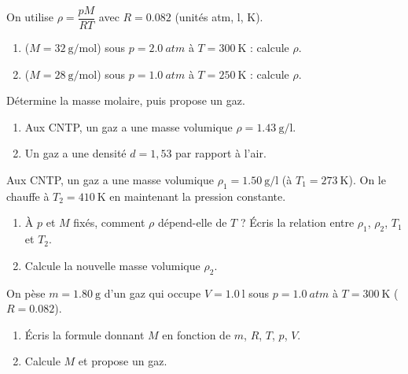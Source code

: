 \documentclass[11pt,a4paper]{article}
\begin{document}
\begin{exo}
On utilise $\rho=\dfrac{pM}{RT}$ avec $R=\num{0,082}$ (unités \si{atm}, \si{\litre}, \si{\kelvin}).
\begin{enumerate}[label=\alph*)]
  \item {} ($M=\qty{32}{\gram\per\mole}$) sous $p=\qty{2.0}{atm}$ à $T=\qty{300}{\kelvin}$ :
        calcule $\rho$.
  \item {} ($M=\qty{28}{\gram\per\mole}$) sous $p=\qty{1.0}{atm}$ à $T=\qty{250}{\kelvin}$ :
        calcule $\rho$.
\end{enumerate}
\end{exo}

\begin{exo}
Détermine la masse molaire, puis propose un gaz.
\begin{enumerate}[label=\alph*)]
  \item Aux CNTP, un gaz a une masse volumique $\rho=\qty{1.43}{\gram\per\litre}$.
  \item Un gaz a une densité $d=1{,}53$ par rapport à l'air.
\end{enumerate}
\end{exo}

\begin{exo}
Aux CNTP, un gaz a une masse volumique $\rho_1=\qty{1.50}{\gram\per\litre}$ (à $T_1=\qty{273}{\kelvin}$).
On le chauffe à $T_2=\qty{410}{\kelvin}$ en maintenant la pression constante.
\begin{enumerate}[label=\alph*)]
  \item À $p$ et $M$ fixés, comment $\rho$ dépend-elle de $T$ ? Écris la relation entre $\rho_1$,
        $\rho_2$, $T_1$ et $T_2$.
  \item Calcule la nouvelle masse volumique $\rho_2$.
\end{enumerate}
\end{exo}

\begin{exo}
On pèse $m=\qty{1.80}{\gram}$ d'un gaz qui occupe $V=\qty{1.0}{\litre}$ sous $p=\qty{1.0}{atm}$ à
$T=\qty{300}{\kelvin}$ ($R=\num{0,082}$).
\begin{enumerate}[label=\alph*)]
  \item Écris la formule donnant $M$ en fonction de $m$, $R$, $T$, $p$, $V$.
  \item Calcule $M$ et propose un gaz.
\end{enumerate}
\end{exo}
\end{document}
